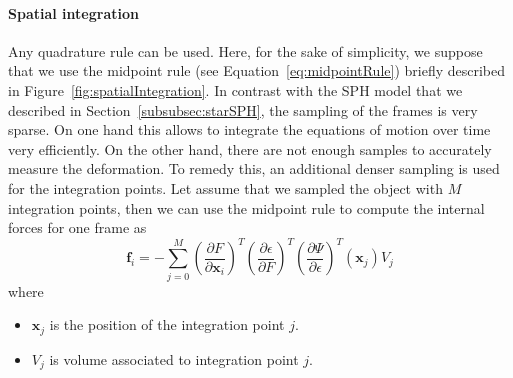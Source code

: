 \paragraph{Spatial integration}

Any quadrature rule can be used. Here, for the sake of simplicity, we suppose that we use the midpoint rule (see Equation~\eqref{eq:midpointRule}) briefly described in Figure~\ref{fig:spatialIntegration}.
In contrast with the SPH model that we described in Section~\ref{subsubsec:starSPH}, the sampling of the frames is very sparse.
On one hand this allows to integrate the equations of motion over time very efficiently. 
On the other hand, there are not enough samples to accurately measure the deformation.
To remedy this, an additional denser sampling is used for the integration points.
Let assume that we sampled the object with $M$ integration points, then we can use the midpoint rule to compute the internal forces for one frame as
\begin{equation}
\label{eq:frameForceComputation}
\displaystyle
\mathbf{f}_{i} =
- \sum_{j=0}^{M}
\left( \frac{\partial F}{\partial \mathbf{x}_{i}} \right)^{T}
\left( \frac{\partial \epsilon}{\partial F} \right)^{T}
\left( \frac{\partial \Psi}{\partial \epsilon} \right)^{T} \left(\mathbf{x}_{j}\right) V_{j} 
\end{equation}
where 
\begin{itemize}
\item $\mathbf{x}_{j}$ is the position of the integration point $j$.
\item $V_{j}$ is volume associated to integration point $j$.
\end{itemize}

